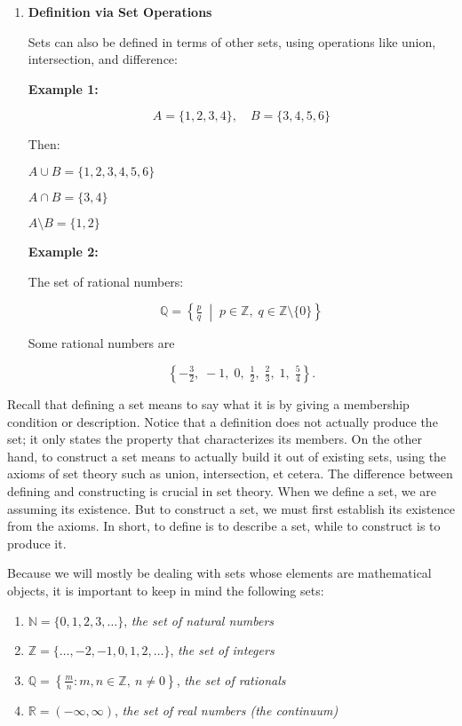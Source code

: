 \documentclass[12pt,a4paper,openany]{article}
\begin{document}
\begin{enumerate}
    \item \textbf{Definition via Set Operations}
    
    Sets can also be defined in terms of other sets, using operations like union, intersection, and difference:
    
    \textbf{Example 1:}
    
    $$A = \{1, 2, 3, 4\}, \quad B = \{3, 4, 5, 6\}$$
    
    Then:
    
    $A \cup B = \{1, 2, 3, 4, 5, 6\}$
    
    $A \cap B = \{3, 4\}$
    
    $A \setminus B = \{1, 2\}$
    
    \textbf{Example 2:}
    
    The set of rational numbers:
    
    $$ \mathbb{Q} = \left\{ \tfrac{p}{q} \;\middle|\; p \in \mathbb{Z}, \; q \in \mathbb{Z} \setminus \{0\} \right\} $$
    
    Some rational numbers are
    
    $$\left\{ -\tfrac{3}{2}, \; -1, \; 0, \; \tfrac{1}{2}, \; \tfrac{2}{3}, \; 1, \; \tfrac{5}{4} \right\}.$$
\end{enumerate}

Recall that defining a set means to say what it is by giving a membership condition or description. Notice that a definition does not actually produce the set; it only states the property that characterizes its members. On the other hand, to construct a set means to actually build it out of existing sets, using the axioms of set theory such as union, intersection, et cetera. The difference between defining and constructing is crucial in set theory. When we define a set, we are assuming its existence. But to construct a set, we must first establish its existence from the axioms. In short, to define is to describe a set, while to construct is to produce it.

Because we will mostly be dealing with sets whose elements are mathematical objects, it is important to keep in mind the following sets:

\begin{enumerate}
    \item $\mathbb{N} = \{0, 1, 2, 3, \dots\}$, \textit{the set of natural numbers}
    \item $\mathbb{Z} = \{\dots, -2, -1, 0, 1, 2, \dots\}$, \textit{the set of integers}
    \item $\mathbb{Q} = \left\{ \tfrac{m}{n} : m, n \in \mathbb{Z},\ n \ne 0 \right\}$, \textit{the set of rationals}
    \item $\mathbb{R} = (-\infty, \infty)$, \textit{the set of real numbers (the continuum)}
\end{enumerate}
\end{document}
